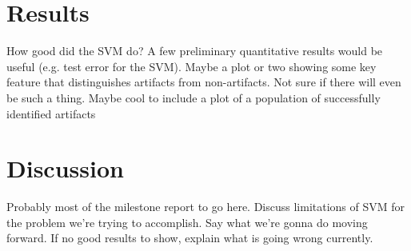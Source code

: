 \documentclass[iop,apj]{emulateapj}
\begin{document}
\section{Results} \label{sec:results}

{\color{red} How good did the SVM do?  A few preliminary quantitative results would be useful (e.g. test error for the SVM).  Maybe a plot or two showing some key feature that distinguishes artifacts from non-artifacts.  Not sure if there will even be such a thing.  Maybe cool to include a plot of a population of successfully identified artifacts}

\section{Discussion} \label{sec:discussion} 

{\color{red} Probably most of the milestone report to go here.  Discuss limitations of SVM for the problem we're 
trying to accomplish.  Say what we're gonna do moving forward.  If no good results to show, explain what is going wrong currently.}
\end{document}
